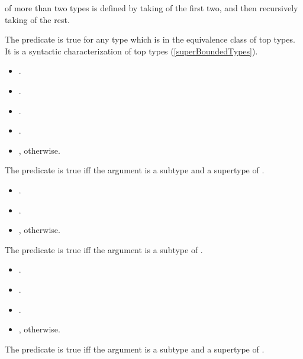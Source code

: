 \documentclass[makeidx]{article}
\begin{document}
{\LMHash{}%
\TopMergeTypeName{} of more than two types is defined by taking
\TopMergeTypeName{} of the first two,
and then recursively taking \TopMergeTypeName{} of the rest.

\LMHash{}%
The \Index{\IsTopTypeName} predicate is true for any type which is in
the equivalence class of top types.
It is a syntactic characterization of top types
(\ref{superBoundedTypes}).

\begin{itemize}
\item {}.
\item {}.
\item {}.
\item {}.
\item {}, otherwise.
\end{itemize}

\noindent
The \Index{\IsObjectTypeName} predicate is true if{}f
the argument is a subtype and a supertype of .

\begin{itemize}
\item {}.
\item {}.
\item {}, otherwise.
\end{itemize}

\noindent
The \Index{\IsBottomTypeName} predicate is true if{}f
the argument is a subtype of .

\begin{itemize}
\item {}.
\item {}.
\item {}.
\item {}, otherwise.
\end{itemize}

\noindent
The \Index{\IsNullTypeName} predicate is true if{}f
the argument is a subtype and a supertype of .

}
\end{document}

